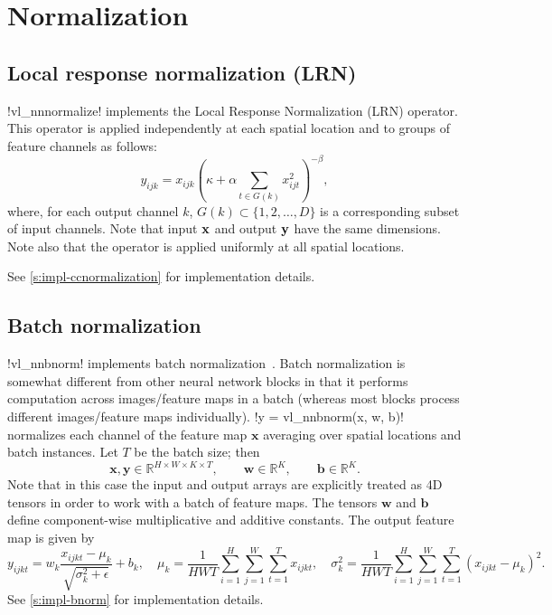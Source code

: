 \section{Normalization}\label{s:normalization}

\subsection{Local response normalization (LRN)}\label{s:ccnormalization}

!vl_nnnormalize! implements the Local Response Normalization (LRN) operator. This operator is applied independently at each spatial location and to groups of feature channels as follows:
\[
 y_{ijk} = x_{ijk} \left( \kappa + \alpha \sum_{t\in G(k)} x_{ijt}^2 \right)^{-\beta},
\]
where, for each output channel $k$, $G(k) \subset \{1, 2, \dots, D\}$ is a corresponding subset of input channels. Note that input $\mathbf{x}$ and output $\mathbf{y}$ have the same dimensions. Note also that the operator is applied uniformly at all spatial locations.

See \cref{s:impl-ccnormalization} for implementation details.

\subsection{Batch normalization}\label{s:bnorm}

!vl_nnbnorm! implements batch normalization~\cite{ioffe2015}. Batch normalization is somewhat different from other neural network blocks in that it performs computation across images/feature maps in a batch (whereas most blocks process different images/feature maps individually). !y = vl_nnbnorm(x, w, b)! normalizes each channel of the feature map $\mathbf{x}$ averaging over spatial locations and batch instances. Let $T$ be the batch size; then
\[
\mathbf{x}, \mathbf{y} \in \mathbb{R}^{H \times W \times K \times T},
\qquad\mathbf{w} \in \mathbb{R}^{K},
\qquad\mathbf{b} \in \mathbb{R}^{K}.
\]
Note that in this case the input and output arrays are explicitly treated as 4D tensors in order to work with a batch of feature maps. The tensors  $\mathbf{w}$ and $\mathbf{b}$ define component-wise multiplicative and additive constants. The output feature map is given by
\[
y_{ijkt} = w_k \frac{x_{ijkt} - \mu_{k}}{\sqrt{\sigma_k^2 + \epsilon}} + b_k,
\quad
\mu_{k} = \frac{1}{HWT}\sum_{i=1}^H \sum_{j=1}^W \sum_{t=1}^{T} x_{ijkt},
\quad
\sigma^2_{k} = \frac{1}{HWT}\sum_{i=1}^H \sum_{j=1}^W \sum_{t=1}^{T} (x_{ijkt} - \mu_{k})^2.
\]
See \cref{s:impl-bnorm} for implementation details.

